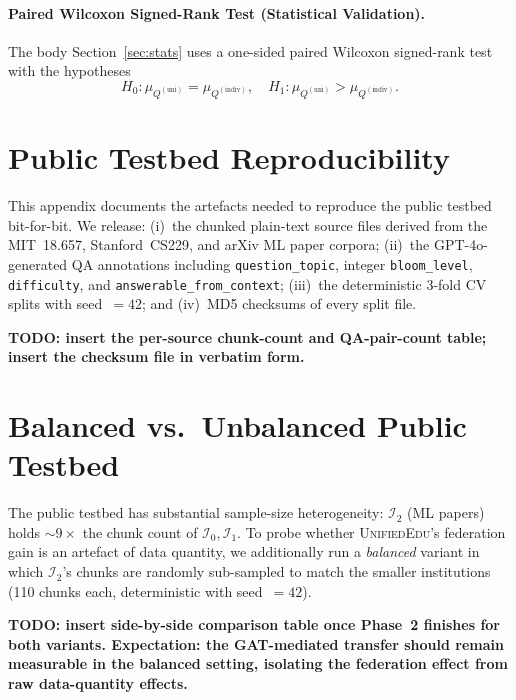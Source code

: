 \documentclass[11pt]{article}
\theoremstyle{plain}
\theoremstyle{definition}
\theoremstyle{remark}
\newcommand{\red}[1]{\textcolor{myred}{\textbf{#1}}}
\newcommand{\UniEdu}{\textsc{UnifiedEdu}}
\newcommand{\indiv}{\text{indiv}}
\newcommand{\uni}{\text{uni}}
\begin{document}
\paragraph{Paired Wilcoxon Signed-Rank Test
(Statistical Validation).}
The body Section~\ref{sec:stats} uses a one-sided
paired Wilcoxon signed-rank test with the
hypotheses
\begin{equation}
  H_0: \mu_{Q^{(\uni)}} = \mu_{Q^{(\indiv)}},\quad
  H_1: \mu_{Q^{(\uni)}} > \mu_{Q^{(\indiv)}}.
  \label{eq:hypothesis_test}
\end{equation}

\section{Public Testbed Reproducibility}
\label{app:reproducibility}

This appendix documents the artefacts needed to
reproduce the public testbed bit-for-bit. We release:
(i)~the chunked plain-text source files derived from
the MIT~18.657, Stanford~CS229, and arXiv ML paper
corpora; (ii)~the GPT-4o-generated QA annotations
including \texttt{question\_topic}, integer
\texttt{bloom\_level}, \texttt{difficulty}, and
\texttt{answerable\_from\_context}; (iii)~the
deterministic 3-fold CV splits with seed~$=42$;
and (iv)~MD5 checksums of every split file.

\red{TODO: insert the per-source chunk-count and QA-pair-count table; insert the checksum file in verbatim form.}

\section{Balanced vs.\ Unbalanced Public Testbed}
\label{app:balanced_vs_unbalanced}

The public testbed has substantial sample-size
heterogeneity: $\mathcal{I}_2$ (ML papers) holds
$\sim 9\times$ the chunk count of
$\mathcal{I}_0,\mathcal{I}_1$. To probe whether
\UniEdu{}'s federation gain is an artefact of data
quantity, we additionally run a \emph{balanced}
variant in which $\mathcal{I}_2$'s chunks are
randomly sub-sampled to match the smaller
institutions (110 chunks each, deterministic with
seed~$=42$).

\red{TODO: insert side-by-side comparison table once Phase~2 finishes for both variants. Expectation: the GAT-mediated transfer should remain measurable in the balanced setting, isolating the federation effect from raw data-quantity effects.}
\end{document}
